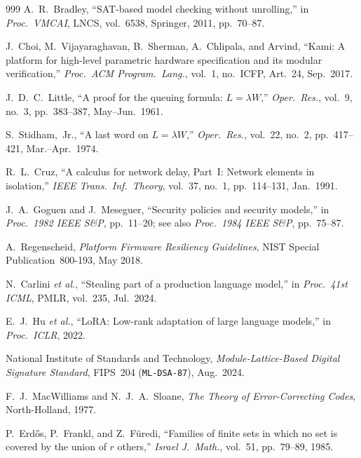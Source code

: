 \documentclass[11pt,letterpaper]{article}
\theoremstyle{spectralthm}
\begin{document}
\begin{thebibliography}{999}
A.~R.~Bradley, ``SAT-based model checking without unrolling,'' in \textit{Proc.\ VMCAI}, LNCS, vol.~6538, Springer, 2011, pp.~70--87.

J.~Choi, M.~Vijayaraghavan, B.~Sherman, A.~Chlipala, and Arvind, ``Kami: A platform for high-level parametric hardware specification and its modular verification,'' \textit{Proc.\ ACM Program.\ Lang.}, vol.~1, no.~ICFP, Art.~24, Sep.\ 2017.

J.~D.~C.~Little, ``A proof for the queuing formula: $L = \lambda W$,'' \textit{Oper.\ Res.}, vol.~9, no.~3, pp.~383--387, May--Jun.\ 1961.

S.~Stidham,~Jr., ``A last word on $L = \lambda W$,'' \textit{Oper.\ Res.}, vol.~22, no.~2, pp.~417--421, Mar.--Apr.\ 1974.

R.~L.~Cruz, ``A calculus for network delay, Part~I: Network elements in isolation,'' \textit{IEEE Trans.\ Inf.\ Theory}, vol.~37, no.~1, pp.~114--131, Jan.\ 1991.

J.~A.~Goguen and J.~Meseguer, ``Security policies and security models,'' in \textit{Proc.\ 1982 IEEE S\&P}, pp.~11--20; see also \textit{Proc.\ 1984 IEEE S\&P}, pp.~75--87.

A.~Regenscheid, \textit{Platform Firmware Resiliency Guidelines}, NIST Special Publication~800-193, May 2018.

N.~Carlini \textit{et al.}, ``Stealing part of a production language model,'' in \textit{Proc.\ 41st ICML}, PMLR, vol.~235, Jul.\ 2024.

E.~J.~Hu \textit{et al.}, ``LoRA: Low-rank adaptation of large language models,'' in \textit{Proc.\ ICLR}, 2022.

National Institute of Standards and Technology, \textit{Module-Lattice-Based Digital Signature Standard}, FIPS~204 (\texttt{ML-DSA-87}), Aug.\ 2024.

F.~J.~MacWilliams and N.~J.~A.~Sloane, \textit{The Theory of Error-Correcting Codes}, North-Holland, 1977.

P.~Erd\H{o}s, P.~Frankl, and Z.~F\"{u}redi, ``Families of finite sets in which no set is covered by the union of $r$ others,'' \textit{Israel J.\ Math.}, vol.~51, pp.~79--89, 1985.


\end{thebibliography}
\end{document}
